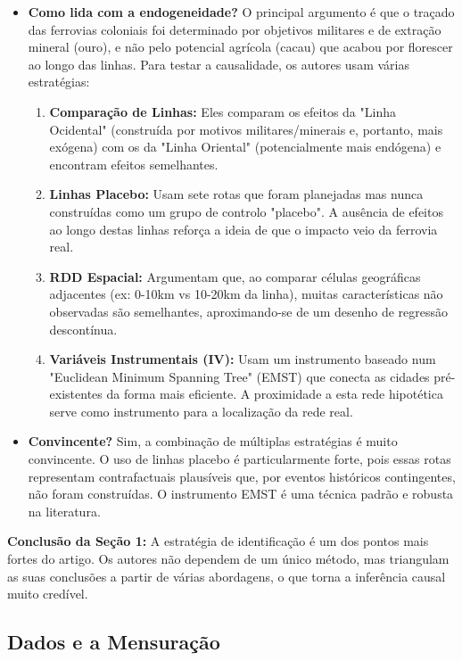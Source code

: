 \documentclass[12pt, a4paper]{article}
\begin{document}
\begin{itemize}
    \item \textbf{Como lida com a endogeneidade?} O principal argumento é que o traçado das ferrovias coloniais foi determinado por objetivos militares e de extração mineral (ouro), e não pelo potencial agrícola (cacau) que acabou por florescer ao longo das linhas. Para testar a causalidade, os autores usam várias estratégias:
    \begin{enumerate}
        \item \textbf{Comparação de Linhas:} Eles comparam os efeitos da "Linha Ocidental" (construída por motivos militares/minerais e, portanto, mais exógena) com os da "Linha Oriental" (potencialmente mais endógena) e encontram efeitos semelhantes.
        \item \textbf{Linhas Placebo:} Usam sete rotas que foram planejadas mas nunca construídas como um grupo de controlo "placebo". A ausência de efeitos ao longo destas linhas reforça a ideia de que o impacto veio da ferrovia real.
        \item \textbf{RDD Espacial:} Argumentam que, ao comparar células geográficas adjacentes (ex: 0-10km vs 10-20km da linha), muitas características não observadas são semelhantes, aproximando-se de um desenho de regressão descontínua.
        \item \textbf{Variáveis Instrumentais (IV):} Usam um instrumento baseado num "Euclidean Minimum Spanning Tree" (EMST) que conecta as cidades pré-existentes da forma mais eficiente. A proximidade a esta rede hipotética serve como instrumento para a localização da rede real.
    \end{enumerate}

    \item \textbf{Convincente?} Sim, a combinação de múltiplas estratégias é muito convincente. O uso de linhas placebo é particularmente forte, pois essas rotas representam contrafactuais plausíveis que, por eventos históricos contingentes, não foram construídas. O instrumento EMST é uma técnica padrão e robusta na literatura.
\end{itemize}

\noindent\textbf{Conclusão da Seção 1:} A estratégia de identificação é um dos pontos mais fortes do artigo. Os autores não dependem de um único método, mas triangulam as suas conclusões a partir de várias abordagens, o que torna a inferência causal muito credível.

\subsection{Dados e a Mensuração}
\end{document}
